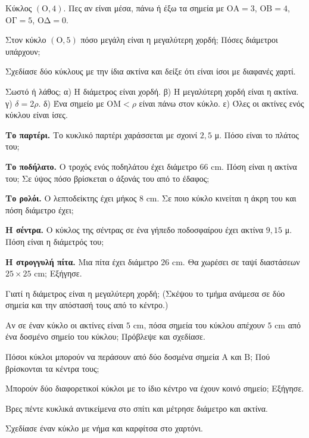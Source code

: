 \ex Κύκλος $(\mathrm{Ο},4)$. Πες αν είναι μέσα, πάνω ή έξω τα σημεία με $\mathrm{ΟΑ}=3$, $\mathrm{ΟΒ}=4$, $\mathrm{ΟΓ}=5$, $\mathrm{ΟΔ}=0$.

\ex Στον κύκλο $(\mathrm{Ο},5)$ πόσο μεγάλη είναι η μεγαλύτερη χορδή; Πόσες διάμετροι υπάρχουν;

\ex Σχεδίασε δύο κύκλους με την ίδια ακτίνα και δείξε ότι είναι ίσοι με διαφανές χαρτί.

\ex Σωστό ή λάθος; α) Η διάμετρος είναι χορδή. \quad β) Η μεγαλύτερη χορδή είναι η ακτίνα. \quad γ) $\delta=2\rho$. \quad δ) Ένα σημείο με $\mathrm{ΟΜ}<\rho$ είναι πάνω στον κύκλο. \quad ε) Όλες οι ακτίνες ενός κύκλου είναι ίσες.


\ex \textbf{Το παρτέρι.} Το κυκλικό παρτέρι χαράσσεται με σχοινί $2{,}5$ μ. Πόσο είναι το πλάτος του;

\ex \textbf{Το ποδήλατο.} Ο τροχός ενός ποδηλάτου έχει διάμετρο $66$ cm. Πόση είναι η ακτίνα του; Σε ύψος πόσο βρίσκεται ο άξονάς του από το έδαφος;

\ex \textbf{Το ρολόι.} Ο λεπτοδείκτης έχει μήκος $8$ cm. Σε ποιο κύκλο κινείται η άκρη του και πόση διάμετρο έχει;

\ex \textbf{Η σέντρα.} Ο κύκλος της σέντρας σε ένα γήπεδο ποδοσφαίρου έχει ακτίνα $9{,}15$ μ. Πόση είναι η διάμετρός του;

\ex \textbf{Η στρογγυλή πίτα.} Μια πίτα έχει διάμετρο $26$ cm. Θα χωρέσει σε ταψί διαστάσεων $25\times25$ cm; Εξήγησε.


\ex Γιατί η διάμετρος είναι η μεγαλύτερη χορδή; (Σκέψου το τμήμα ανάμεσα σε δύο σημεία και την απόστασή τους από το κέντρο.)

\ex Αν σε έναν κύκλο οι ακτίνες είναι $5$ cm, πόσα σημεία του κύκλου απέχουν $5$ cm από ένα δοσμένο σημείο του κύκλου; Πρόβλεψε και σχεδίασε.

\ex Πόσοι κύκλοι μπορούν να περάσουν από δύο δοσμένα σημεία $\mathrm{Α}$ και $\mathrm{Β}$; Πού βρίσκονται τα κέντρα τους;

\ex Μπορούν δύο διαφορετικοί κύκλοι με το ίδιο κέντρο να έχουν κοινό σημείο; Εξήγησε.


\ex Βρες πέντε κυκλικά αντικείμενα στο σπίτι και μέτρησε διάμετρο και ακτίνα.

\ex Σχεδίασε έναν κύκλο με νήμα και καρφίτσα στο χαρτόνι.
